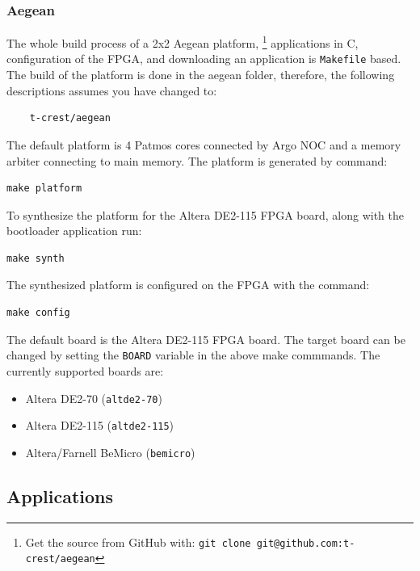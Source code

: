 \documentclass[a4paper,fontsize=10pt,twoside,DIV15,BCOR12mm,headinclude=true,footinclude=false,pagesize,bibtotoc]{scrbook}
\newcommand{\code}[1]{{\texttt{#1}}}
\begin{document}
\subsubsection{Aegean}

The whole build process of a 2x2 Aegean platform,
\footnote{Get the source from GitHub with: \code{git clone git@github.com:t-crest/aegean}} 
applications %
in C, configuration of the FPGA, and downloading an application
is \code{Makefile} based. The build of the platform is done in the aegean folder,
therefore, the following descriptions assumes you have changed to:

\begin{verbatim}
	t-crest/aegean
\end{verbatim}

The default platform is 4 Patmos cores connected by Argo NOC 
and a memory arbiter connecting to main memory.
The platform is generated by command:

\begin{verbatim}
make platform
\end{verbatim}

To synthesize the platform for the Altera DE2-115 FPGA board, along with the bootloader application run:

\begin{verbatim}
make synth
\end{verbatim}

The synthesized platform is configured on the FPGA with the command:

\begin{verbatim}
make config
\end{verbatim}

The default board is the Altera DE2-115 FPGA board. The target board can be changed by
setting the \code{BOARD} variable in the above make commmands. The currently supported boards are:

\begin{itemize}
\item Altera DE2-70 (\code{altde2-70})
\item Altera DE2-115 (\code{altde2-115})
\item Altera/Farnell BeMicro (\code{bemicro})
\end{itemize}


\subsection{Applications}
\end{document}
